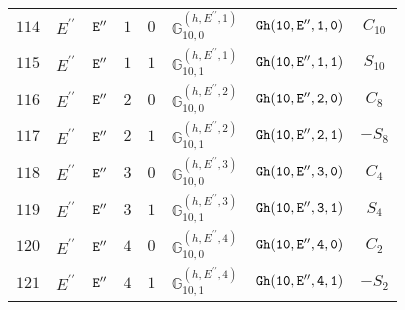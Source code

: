 \documentclass[fleqn,8pt]{jsarticle}
\begin{document}
\begin{table}[ht!]
\begin{center}
\begin{tabular}{cccccccc}
$ 114 $ & $ E^{\prime\prime} $ & $ {\tt E''} $ & $ 1 $ & $ 0 $ & $ \mathbb{G}_{10,0}^{(h,E^{\prime\prime},1)} $ & $ {\tt Gh(10,E'',1,0)} $ & $ C_{10} $ \\
$ 115 $ & $ E^{\prime\prime} $ & $ {\tt E''} $ & $ 1 $ & $ 1 $ & $ \mathbb{G}_{10,1}^{(h,E^{\prime\prime},1)} $ & $ {\tt Gh(10,E'',1,1)} $ & $ S_{10} $ \\
$ 116 $ & $ E^{\prime\prime} $ & $ {\tt E''} $ & $ 2 $ & $ 0 $ & $ \mathbb{G}_{10,0}^{(h,E^{\prime\prime},2)} $ & $ {\tt Gh(10,E'',2,0)} $ & $ C_{8} $ \\
$ 117 $ & $ E^{\prime\prime} $ & $ {\tt E''} $ & $ 2 $ & $ 1 $ & $ \mathbb{G}_{10,1}^{(h,E^{\prime\prime},2)} $ & $ {\tt Gh(10,E'',2,1)} $ & $ - S_{8} $ \\
$ 118 $ & $ E^{\prime\prime} $ & $ {\tt E''} $ & $ 3 $ & $ 0 $ & $ \mathbb{G}_{10,0}^{(h,E^{\prime\prime},3)} $ & $ {\tt Gh(10,E'',3,0)} $ & $ C_{4} $ \\
$ 119 $ & $ E^{\prime\prime} $ & $ {\tt E''} $ & $ 3 $ & $ 1 $ & $ \mathbb{G}_{10,1}^{(h,E^{\prime\prime},3)} $ & $ {\tt Gh(10,E'',3,1)} $ & $ S_{4} $ \\
$ 120 $ & $ E^{\prime\prime} $ & $ {\tt E''} $ & $ 4 $ & $ 0 $ & $ \mathbb{G}_{10,0}^{(h,E^{\prime\prime},4)} $ & $ {\tt Gh(10,E'',4,0)} $ & $ C_{2} $ \\
$ 121 $ & $ E^{\prime\prime} $ & $ {\tt E''} $ & $ 4 $ & $ 1 $ & $ \mathbb{G}_{10,1}^{(h,E^{\prime\prime},4)} $ & $ {\tt Gh(10,E'',4,1)} $ & $ - S_{2} $ \\
 \hline \hline
\end{tabular}
\end{center}
\end{table}
\end{document}
